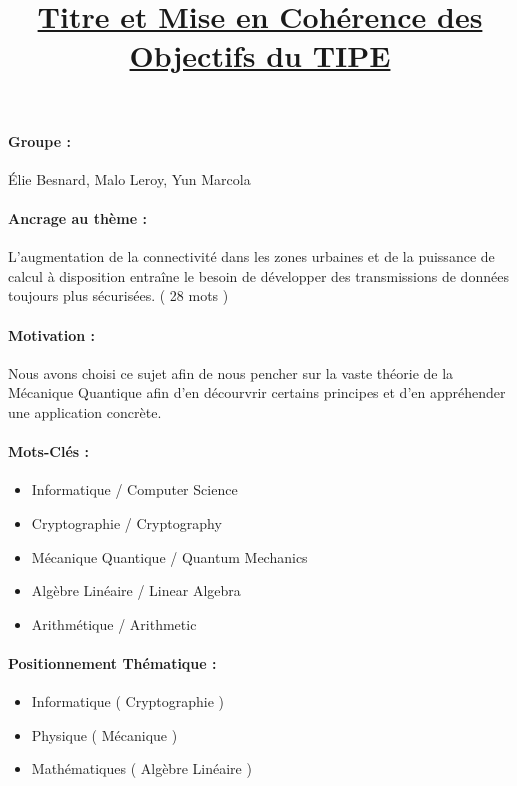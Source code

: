 \documentclass{article}
\title{\textbf{\underline{Titre et Mise en Cohérence des Objectifs du TIPE}}}
\author{}
\date{}
\begin{document}
\maketitle

\paragraph{Groupe :} Élie Besnard, Malo Leroy, Yun Marcola

\paragraph{Ancrage au thème :} L’augmentation de la connectivité dans les zones urbaines et de la puissance de calcul à disposition entraîne le besoin de développer des transmissions de données toujours plus sécurisées. \newline ( 28 mots ) %

\paragraph{Motivation :} Nous avons choisi ce sujet afin de nous pencher sur la vaste théorie de la Mécanique Quantique afin d'en décourvrir certains principes et d'en appréhender une application concrète.

\paragraph{Mots-Clés :} 

\begin{itemize}
    \item Informatique / Computer Science
    \item Cryptographie / Cryptography
    \item Mécanique Quantique / Quantum Mechanics
    \item Algèbre Linéaire / Linear Algebra
    \item Arithmétique / Arithmetic
\end{itemize}

\paragraph{Positionnement Thématique :} 

\begin{itemize}
    \item Informatique ( Cryptographie )
    \item Physique ( Mécanique )
    \item Mathématiques ( Algèbre Linéaire )
\end{itemize} 
\end{document}
